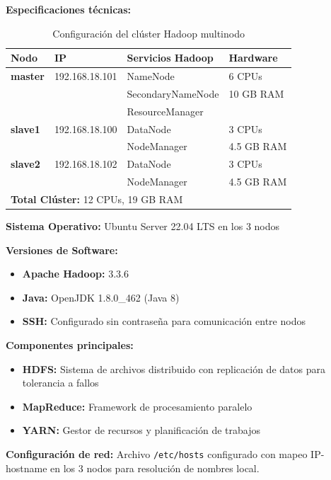 \documentclass[12pt,a4paper]{article}
\begin{document}
\textbf{Especificaciones técnicas:}

\begin{table}[H]
\centering
\begin{tabular}{llll}
\toprule
\textbf{Nodo} & \textbf{IP} & \textbf{Servicios Hadoop} & \textbf{Hardware} \\
\midrule
\textbf{master} & 192.168.18.101 & NameNode & 6 CPUs \\
 & & SecondaryNameNode & 10 GB RAM \\
 & & ResourceManager & \\
\midrule
\textbf{slave1} & 192.168.18.100 & DataNode & 3 CPUs \\
 & & NodeManager & 4.5 GB RAM \\
\midrule
\textbf{slave2} & 192.168.18.102 & DataNode & 3 CPUs \\
 & & NodeManager & 4.5 GB RAM \\
\midrule
\multicolumn{4}{l}{\textbf{Total Clúster:} 12 CPUs, 19 GB RAM} \\
\bottomrule
\end{tabular}
\caption{Configuración del clúster Hadoop multinodo}
\label{tab:cluster_config}
\end{table}

\textbf{Sistema Operativo:} Ubuntu Server 22.04 LTS en los 3 nodos

\textbf{Versiones de Software:}
\begin{itemize}
    \item \textbf{Apache Hadoop:} 3.3.6
    \item \textbf{Java:} OpenJDK 1.8.0\_462 (Java 8)
    \item \textbf{SSH:} Configurado sin contraseña para comunicación entre nodos
\end{itemize}

\textbf{Componentes principales:}
\begin{itemize}
    \item \textbf{HDFS:} Sistema de archivos distribuido con replicación de datos para tolerancia a fallos
    \item \textbf{MapReduce:} Framework de procesamiento paralelo
    \item \textbf{YARN:} Gestor de recursos y planificación de trabajos
\end{itemize}

\textbf{Configuración de red:} Archivo \texttt{/etc/hosts} configurado con mapeo IP-hostname en los 3 nodos para resolución de nombres local.
\end{document}
